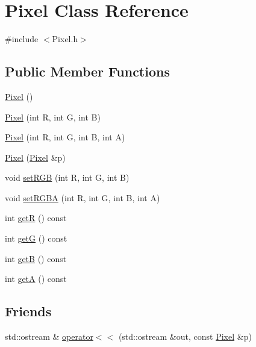\hypertarget{class_pixel}{\section{Pixel Class Reference}
\label{class_pixel}
}


{\ttfamily \#include $<$Pixel.\-h$>$}

\subsection*{Public Member Functions}
\begin{DoxyCompactItemize}
\item 
\hyperlink{class_pixel_a27ad99a2f705e635c42d242d530d4756}{Pixel} ()
\item 
\hyperlink{class_pixel_a9ba4bf2d33c6d503e30059e61a43c045}{Pixel} (int R, int G, int B)
\item 
\hyperlink{class_pixel_a7a99c26ff5ea05251c24b5897443efda}{Pixel} (int R, int G, int B, int A)
\item 
\hyperlink{class_pixel_aa130b6db6edd3e7145a70a39c6eb2439}{Pixel} (\hyperlink{class_pixel}{Pixel} \&p)
\item 
void \hyperlink{class_pixel_a32492f5ea18dbc883b721948efe07764}{set\-R\-G\-B} (int R, int G, int B)
\item 
void \hyperlink{class_pixel_a58de4c2c1419fde30f4f3428eed66a0a}{set\-R\-G\-B\-A} (int R, int G, int B, int A)
\item 
int \hyperlink{class_pixel_afdb27eea61316a8f08cf10685e813dd5}{get\-R} () const 
\item 
int \hyperlink{class_pixel_ad1badd12caea7dba660ca7f5d0df241e}{get\-G} () const 
\item 
int \hyperlink{class_pixel_abce7ab2c36592c9ee041eb8ce68900b4}{get\-B} () const 
\item 
int \hyperlink{class_pixel_aea305b0ebe5f965236a6417edf83681d}{get\-A} () const 
\end{DoxyCompactItemize}
\subsection*{Friends}
\begin{DoxyCompactItemize}
\item 
std\-::ostream \& \hyperlink{class_pixel_a8162d24b145dcb53be8e5b1ba52df5be}{operator$<$$<$} (std\-::ostream \&out, const \hyperlink{class_pixel}{Pixel} \&p)
\end{DoxyCompactItemize}


